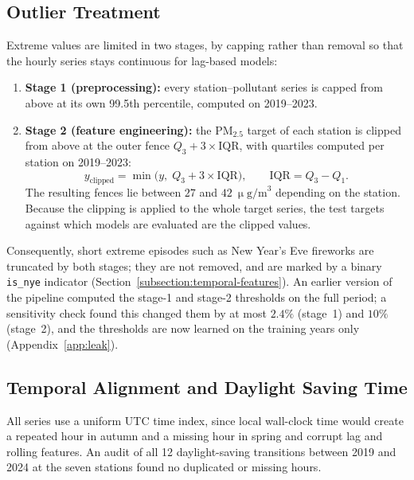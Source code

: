 \subsection{Outlier Treatment}
\label{subsection:outlier-treatment}
Extreme values are limited in two stages, by capping rather than removal so that the hourly series stays continuous for lag-based models:
\begin{enumerate}
    \item \textbf{Stage 1 (preprocessing):} every station--pollutant series is capped from above at its own 99.5th percentile, computed on 2019--2023.
    \item \textbf{Stage 2 (feature engineering):} the PM$_{2.5}$ target of each station is clipped from above at the outer fence $Q_3 + 3\times\text{IQR}$, with quartiles computed per station on 2019--2023:
    \begin{equation}
        y_{\text{clipped}} = \min\big(y,\; Q_3 + 3\times\text{IQR}\big), \qquad \text{IQR} = Q_3 - Q_1 .
    \end{equation}
    The resulting fences lie between $27$ and $42~\upmu\text{g/m}^3$ depending on the station. Because the clipping is applied to the whole target series, the test targets against which models are evaluated are the clipped values.
\end{enumerate}
Consequently, short extreme episodes such as New Year's Eve fireworks are truncated by both stages; they are not removed, and are marked by a binary \texttt{is\_nye} indicator (Section~\ref{subsection:temporal-features}). An earlier version of the pipeline computed the stage-1 and stage-2 thresholds on the full period; a sensitivity check found this changed them by at most $2.4\%$ (stage~1) and $10\%$ (stage~2), and the thresholds are now learned on the training years only (Appendix~\ref{app:leak}).

\subsection{Temporal Alignment and Daylight Saving Time}
\label{subsection:temporal-alignment}
All series use a uniform UTC time index, since local wall-clock time would create a repeated hour in autumn and a missing hour in spring and corrupt lag and rolling features. An audit of all 12 daylight-saving transitions between 2019 and 2024 at the seven stations found no duplicated or missing hours.

